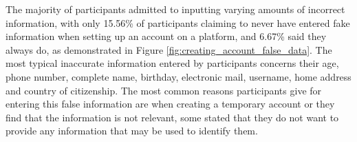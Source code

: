 

The majority of participants admitted to inputting varying amounts of
incorrect information, with only 15.56\% of participants claiming to never
have entered fake information when setting up an account on a platform,
and 6.67\% said they always do, as demonstrated in Figure \ref{fig:creating_account_false_data}.
The most typical inaccurate information
entered by participants concerns their age, phone number, complete name,
birthday, electronic mail, username, home address and country of citizenship.
The most common reasons participants give for entering this false
information are when creating a temporary account or they
find that the information is not relevant, some stated that they do
not want to provide any information that may be used to identify them.

